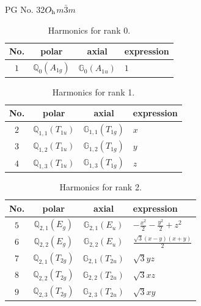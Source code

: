 \documentclass[fleqn,8pt,landscape]{jsarticle}
\begin{document}
\setcounter{MaxMatrixCols}{32}

\renewcommand{\tablename}{Table~}
\renewcommand{\figurename}{Figure~}
\begin{center}
\LARGE
PG No. 32\quad$O_{\rm h}$\quad$m\bar{3}m$\quad[ cubic ]
\end{center}
\begin{table}[ht!]
\begin{center}
\caption{Harmonics for rank 0.}
\renewcommand{\arraystretch}{1.3}
\begin{tabular}{cccl} \hline \hline
No. & polar & axial & expression \\ \hline
$ 1 $ & $ \mathbb{Q}_{0}(A_{1g}) $ & $ \mathbb{G}_{0}(A_{1u}) $ & $ 1 $ \\
 \hline \hline
\end{tabular}
\end{center}
\end{table}
\begin{table}[ht!]
\begin{center}
\caption{Harmonics for rank 1.}
\renewcommand{\arraystretch}{1.3}
\begin{tabular}{cccl} \hline \hline
No. & polar & axial & expression \\ \hline
$ 2 $ & $ \mathbb{Q}_{1,1}(T_{1u}) $ & $ \mathbb{G}_{1,1}(T_{1g}) $ & $ x $ \\
$ 3 $ & $ \mathbb{Q}_{1,2}(T_{1u}) $ & $ \mathbb{G}_{1,2}(T_{1g}) $ & $ y $ \\
$ 4 $ & $ \mathbb{Q}_{1,3}(T_{1u}) $ & $ \mathbb{G}_{1,3}(T_{1g}) $ & $ z $ \\
 \hline \hline
\end{tabular}
\end{center}
\end{table}
\begin{table}[ht!]
\begin{center}
\caption{Harmonics for rank 2.}
\renewcommand{\arraystretch}{1.3}
\begin{tabular}{cccl} \hline \hline
No. & polar & axial & expression \\ \hline
$ 5 $ & $ \mathbb{Q}_{2,1}(E_{g}) $ & $ \mathbb{G}_{2,1}(E_{u}) $ & $ - \frac{x^{2}}{2} - \frac{y^{2}}{2} + z^{2} $ \\
$ 6 $ & $ \mathbb{Q}_{2,2}(E_{g}) $ & $ \mathbb{G}_{2,2}(E_{u}) $ & $ \frac{\sqrt{3} \left(x - y\right) \left(x + y\right)}{2} $ \\
$ 7 $ & $ \mathbb{Q}_{2,1}(T_{2g}) $ & $ \mathbb{G}_{2,1}(T_{2u}) $ & $ \sqrt{3} y z $ \\
$ 8 $ & $ \mathbb{Q}_{2,2}(T_{2g}) $ & $ \mathbb{G}_{2,2}(T_{2u}) $ & $ \sqrt{3} x z $ \\
$ 9 $ & $ \mathbb{Q}_{2,3}(T_{2g}) $ & $ \mathbb{G}_{2,3}(T_{2u}) $ & $ \sqrt{3} x y $ \\
 \hline \hline
\end{tabular}
\end{center}
\end{table}
\end{document}

